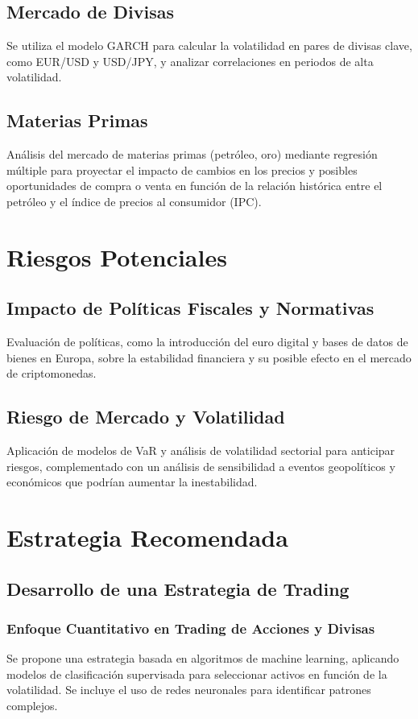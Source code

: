 \documentclass{report}
\begin{document}
\section{Mercado de Divisas}
Se utiliza el modelo GARCH para calcular la volatilidad en pares de divisas clave, como EUR/USD y USD/JPY, y analizar correlaciones en periodos de alta volatilidad.

\section{Materias Primas}
Análisis del mercado de materias primas (petróleo, oro) mediante regresión múltiple para proyectar el impacto de cambios en los precios y posibles oportunidades de compra o venta en función de la relación histórica entre el petróleo y el índice de precios al consumidor (IPC).

\chapter{Riesgos Potenciales}
\section{Impacto de Políticas Fiscales y Normativas}
Evaluación de políticas, como la introducción del euro digital y bases de datos de bienes en Europa, sobre la estabilidad financiera y su posible efecto en el mercado de criptomonedas.

\section{Riesgo de Mercado y Volatilidad}
Aplicación de modelos de VaR y análisis de volatilidad sectorial para anticipar riesgos, complementado con un análisis de sensibilidad a eventos geopolíticos y económicos que podrían aumentar la inestabilidad.

\chapter{Estrategia Recomendada}
\section{Desarrollo de una Estrategia de Trading}
\subsection{Enfoque Cuantitativo en Trading de Acciones y Divisas}
Se propone una estrategia basada en algoritmos de machine learning, aplicando modelos de clasificación supervisada para seleccionar activos en función de la volatilidad. Se incluye el uso de redes neuronales para identificar patrones complejos.
\end{document}

